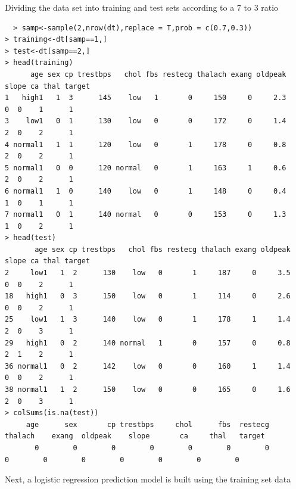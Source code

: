 \documentclass{article}
\begin{document}
Dividing the data set into training and test sets according to a 7 to 3 ratio
\begin{lstlisting}
  > samp<-sample(2,nrow(dt),replace = T,prob = c(0.7,0.3))
> training<-dt[samp==1,]
> test<-dt[samp==2,]
> head(training)
      age sex cp trestbps   chol fbs restecg thalach exang oldpeak slope ca thal target
1   high1   1  3      145    low   1       0     150     0     2.3     0  0    1      1
3    low1   0  1      130    low   0       0     172     0     1.4     2  0    2      1
4 normal1   1  1      120    low   0       1     178     0     0.8     2  0    2      1
5 normal1   0  0      120 normal   0       1     163     1     0.6     2  0    2      1
6 normal1   1  0      140    low   0       1     148     0     0.4     1  0    1      1
7 normal1   0  1      140 normal   0       0     153     0     1.3     1  0    2      1
> head(test)
       age sex cp trestbps   chol fbs restecg thalach exang oldpeak slope ca thal target
2     low1   1  2      130    low   0       1     187     0     3.5     0  0    2      1
18   high1   0  3      150    low   0       1     114     0     2.6     0  0    2      1
25    low1   1  3      140    low   0       1     178     1     1.4     2  0    3      1
29   high1   0  2      140 normal   1       0     157     0     0.8     2  1    2      1
36 normal1   0  2      142    low   0       0     160     1     1.4     0  0    2      1
38 normal1   1  2      150    low   0       0     165     0     1.6     2  0    3      1
> colSums(is.na(test))
     age      sex       cp trestbps     chol      fbs  restecg  thalach    exang  oldpeak    slope       ca     thal   target 
       0        0        0        0        0        0        0        0        0        0        0        0        0        0 
\end{lstlisting}

Next, a logistic regression prediction model is built using the training set data
\end{document}
